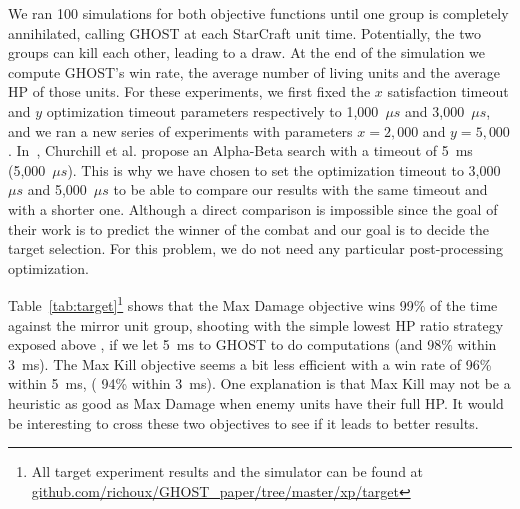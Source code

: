 \documentclass[journal]{IEEEtran}
\newcommand{\minormod}[1]{\color{red} #1\color{black} \xspace}
\newcommand{\ghost}{\textsc{GHOST}\xspace}
\newcommand{\ie}{\textit{i.e.}}
\begin{document}
We ran 100 simulations for both objective functions until one group is
completely  annihilated,   calling  \ghost  at  each   StarCraft  unit
time. Potentially,  the two groups can  kill each other, leading  to a
draw. At the end of  the simulation we compute \ghost's  win rate, the average
number of living units  and the
average HP of those units. For these  experiments, we
first fixed the $x$ satisfaction  timeout and $y$ optimization timeout
parameters respectively  to 1,000~$\mu s$ and  3,000~$\mu s$, and we  ran a new  series of
experiments with parameters  $x=2,000$ and $y=5,000$.  In~\cite{ChurchillSB12,
  ChurchillB12}, Churchill et al. propose an Alpha-Beta search with a timeout
of 5~ms (5,000~$\mu s$).   This is  why  we have  chosen to  set the  optimization
timeout to  3,000~$\mu s$ and 5,000~$\mu s$ to be able to compare our results with  the same timeout
and   with  a   shorter  one.  Although a direct comparison is impossible since the goal of their work is to predict the winner of the combat and our goal is to decide the target selection.
  For  this   problem, we do not need any   particular
post-processing optimization.


Table~\ref{tab:target}\footnote{All target experiment results and the
  simulator can be found at
  \href{https://github.com/richoux/GHOST\_paper/tree/master/xp/target}{github.com/richoux/GHOST\_paper/tree/master/xp/target}}
shows that the Max Damage objective wins \minormod{99\%} of the time against the
mirror unit group, \minormod{shooting with the simple lowest HP ratio strategy
exposed above}, if we let 5~ms to \ghost to do computations (and \minormod{98\%}
within 3~ms).  The Max Kill objective seems a bit less efficient with a win
rate of \minormod{96\%} within 5~ms, (\minormod{94\%} within 3~ms). One explanation is that
Max Kill may not be a heuristic as good as Max Damage when enemy units
have their full HP.  It would be interesting to cross these two
objectives to see if it leads to better results.
\end{document}
